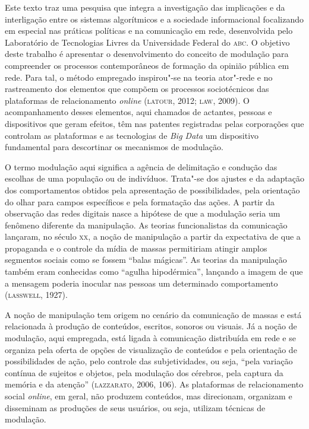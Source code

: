 \noindent{}Este texto traz uma pesquisa que integra a investigação das implicações
e da interligação entre os sistemas algorítmicos e a sociedade
informacional focalizando em especial nas práticas políticas e na
comunicação em rede, desenvolvida pelo Laboratório de Tecnologias Livres
da Universidade Federal do \textsc{abc}. O objetivo deste trabalho é apresentar o
desenvolvimento do conceito de modulação para compreender os processos
contemporâneos de formação da opinião pública em rede. Para tal, o
método empregado inspirou"-se na teoria ator"-rede e no rastreamento dos
elementos que compõem os processos sociotécnicos das plataformas de
relacionamento \textit{online} (\textsc{latour}, 2012; \textsc{law}, 2009). O acompanhamento
desses elementos, aqui chamados de actantes, pessoas e dispositivos que
geram efeitos, têm nas patentes registradas pelas corporações que
controlam as plataformas e as tecnologias de \textit{Big Data} um dispositivo
fundamental para descortinar os mecanismos de modulação.

O termo modulação aqui significa a agência de delimitação e condução das
escolhas de uma população ou de indivíduos. Trata"-se dos ajustes e da
adaptação dos comportamentos obtidos pela apresentação de
possibilidades, pela orientação do olhar para campos específicos e pela
formatação das ações. A partir da observação das redes digitais nasce a
hipótese de que a modulação seria um fenômeno diferente da manipulação.
As teorias funcionalistas da comunicação lançaram, no século \textsc{xx}, a noção
de manipulação a partir da expectativa de que a propaganda e o controle
da mídia de massas permitiriam atingir amplos segmentos sociais como se
fossem ``balas mágicas''. As teorias da manipulação também eram
conhecidas como ``agulha hipodérmica'', lançando a imagem de que a
mensagem poderia inocular nas pessoas um determinado comportamento
(\textsc{lasswell}, 1927).

A noção de manipulação tem origem no cenário da comunicação de massas e
está relacionada à produção de conteúdos, escritos, sonoros ou visuais.
Já a noção de modulação, aqui empregada, está ligada à comunicação
distribuída em rede e se organiza pela oferta de opções de visualização
de conteúdos e pela orientação de possibilidades de ação, pelo controle
das subjetividades, ou seja, ``pela variação contínua de sujeitos e
objetos, pela modulação dos cérebros, pela captura da memória e da
atenção'' (\textsc{lazzarato}, 2006, 106). As plataformas de relacionamento
social \textit{online}, em geral, não produzem conteúdos, mas direcionam,
organizam e disseminam as produções de seus usuários, ou seja, utilizam
técnicas de modulação.

